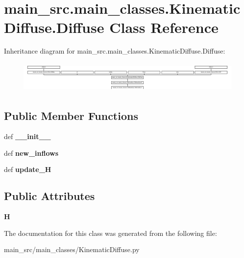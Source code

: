 \hypertarget{classmain__src_1_1main__classes_1_1KinematicDiffuse_1_1Diffuse}{\section{main\-\_\-src.\-main\-\_\-classes.\-Kinematic\-Diffuse.\-Diffuse Class Reference}
\label{classmain__src_1_1main__classes_1_1KinematicDiffuse_1_1Diffuse}
}
Inheritance diagram for main\-\_\-src.\-main\-\_\-classes.\-Kinematic\-Diffuse.\-Diffuse\-:\begin{figure}[H]
\begin{center}
\leavevmode
\includegraphics[height=1.571268cm]{classmain__src_1_1main__classes_1_1KinematicDiffuse_1_1Diffuse}
\end{center}
\end{figure}
\subsection*{Public Member Functions}
\begin{DoxyCompactItemize}
\item 
\hypertarget{classmain__src_1_1main__classes_1_1KinematicDiffuse_1_1Diffuse_aa34aa3ff3e31e4ecf062966d613dcd8b}{def {\bfseries \-\_\-\-\_\-init\-\_\-\-\_\-}}\label{classmain__src_1_1main__classes_1_1KinematicDiffuse_1_1Diffuse_aa34aa3ff3e31e4ecf062966d613dcd8b}

\item 
\hypertarget{classmain__src_1_1main__classes_1_1KinematicDiffuse_1_1Diffuse_a76cc45825e13aee261e4866f4a16e93b}{def {\bfseries new\-\_\-inflows}}\label{classmain__src_1_1main__classes_1_1KinematicDiffuse_1_1Diffuse_a76cc45825e13aee261e4866f4a16e93b}

\item 
\hypertarget{classmain__src_1_1main__classes_1_1KinematicDiffuse_1_1Diffuse_af3e36fbb44f8be7d503e117fbe852dcd}{def {\bfseries update\-\_\-\-H}}\label{classmain__src_1_1main__classes_1_1KinematicDiffuse_1_1Diffuse_af3e36fbb44f8be7d503e117fbe852dcd}

\end{DoxyCompactItemize}
\subsection*{Public Attributes}
\begin{DoxyCompactItemize}
\item 
\hypertarget{classmain__src_1_1main__classes_1_1KinematicDiffuse_1_1Diffuse_af252ef6d6ce9b5c5ca7b8e1f7fe70282}{{\bfseries H}}\label{classmain__src_1_1main__classes_1_1KinematicDiffuse_1_1Diffuse_af252ef6d6ce9b5c5ca7b8e1f7fe70282}

\end{DoxyCompactItemize}


The documentation for this class was generated from the following file\-:\begin{DoxyCompactItemize}
\item 
main\-\_\-src/main\-\_\-classes/Kinematic\-Diffuse.\-py\end{DoxyCompactItemize}
